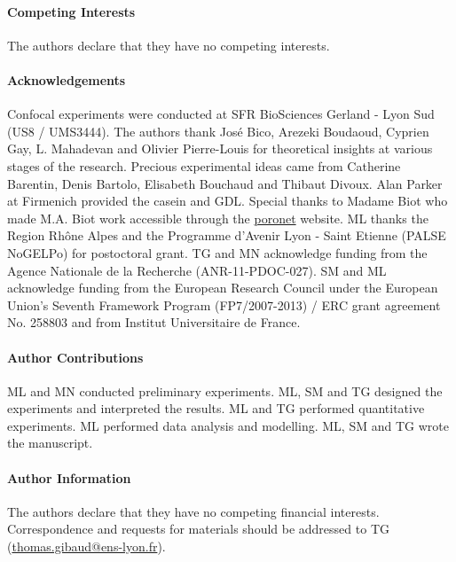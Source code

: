 \documentclass[twocolumn,superscriptaddress,showpacs,preprintnumbers, amsmath,amssymb,prl]{revtex4-1}
\begin{document}
\paragraph*{Competing Interests}
The authors declare that they have no competing interests.

\paragraph*{Acknowledgements}
Confocal experiments were conducted at SFR BioSciences Gerland - Lyon Sud (US8 / UMS3444).
The authors thank Jos\'e Bico, Arezeki Boudaoud, Cyprien Gay, L. Mahadevan and Olivier Pierre-Louis for theoretical insights at various stages of the research. 
Precious experimental ideas came from Catherine Barentin, Denis Bartolo, Elisabeth Bouchaud and Thibaut Divoux.
Alan Parker at Firmenich provided the casein and GDL. 
Special thanks to Madame Biot who made M.A. Biot work accessible through the \href{http://www.olemiss.edu/sciencenet/poronet/}{poronet} website. 
ML thanks the Region Rhône Alpes and the Programme d'Avenir Lyon - Saint Etienne (PALSE NoGELPo) for postoctoral grant. 
TG and MN acknowledge funding from the Agence Nationale de la Recherche (ANR-11-PDOC-027). 
SM and ML acknowledge funding from the European Research Council under the European Union's Seventh Framework Program (FP7/2007-2013) / ERC grant agreement No. 258803 and from Institut Universitaire de France.


\paragraph*{Author Contributions}
ML and MN conducted preliminary experiments. ML, SM and TG designed the experiments and interpreted the results. ML and TG performed quantitative experiments. ML performed data analysis and modelling. ML, SM and TG wrote the manuscript.


\paragraph*{Author Information} 
The authors declare that they have no competing financial interests. 
Correspondence and requests for materials should be addressed to TG (\href{mailto:thomas.gibaud@ens-lyon.fr}{thomas.gibaud@ens-lyon.fr}).
\end{document}
